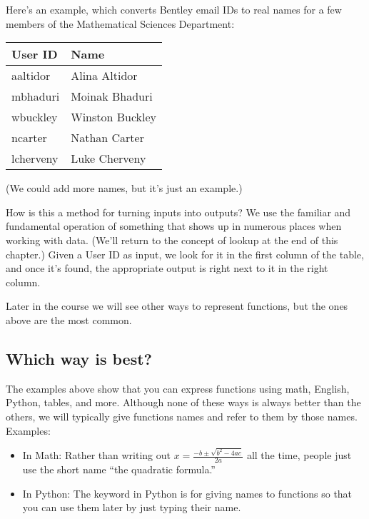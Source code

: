 \documentclass[letterpaper,10pt,english]{sphinxmanual}
\begin{document}
Here’s an example, which converts Bentley email IDs to real names for a few members of the Mathematical Sciences Department:


\begin{savenotes}\sphinxattablestart
\centering
\begin{tabulary}{\linewidth}[t]{|T|T|}
\hline
\sphinxstyletheadfamily 
User ID
&\sphinxstyletheadfamily 
Name
\\
\hline
aaltidor
&
Alina Altidor
\\
\hline
mbhaduri
&
Moinak Bhaduri
\\
\hline
wbuckley
&
Winston Buckley
\\
\hline
ncarter
&
Nathan Carter
\\
\hline
lcherveny
&
Luke Cherveny
\\
\hline
\end{tabulary}
\par
\sphinxattableend\end{savenotes}

(We could add more names, but it’s just an example.)

How is this a method for turning inputs into outputs?  We use the familiar and fundamental operation of  something that shows up in numerous places when working with data.  (We’ll return to the concept of lookup at the end of this chapter.)  Given a User ID as input, we look for it in the first column of the table, and once it’s found, the appropriate output is right next to it in the right column.

 Later in the course we will see other ways to represent functions, but the ones above are the most common.


\subsection{Which way is best?}
\label{\detokenize{chapter-2-mathematical-foundations:which-way-is-best}}
The examples above show that you can express functions using math, English, Python, tables, and more.  Although none of these ways is always better than the others, we will typically give functions names and refer to them by those names.  Examples:
\begin{itemize}
\item {} 
In Math:  Rather than writing out \(x=\frac{-b\pm\sqrt{b^2-4ac}}{2a}\) all the time, people just use the short name “the quadratic formula.”

\item {} 
In Python:  The  keyword in Python is for giving names to functions so that you can use them later by just typing their name.

\end{itemize}
\end{document}
